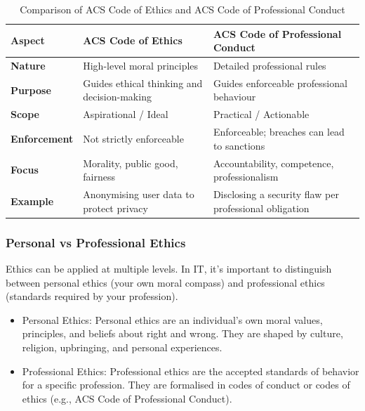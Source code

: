 \begin{table}[htbp]
\centering
\renewcommand{\arraystretch}{1.35}
\begin{tabular}{|p{3cm}|p{7cm}|p{7cm}|}
\hline
\textbf{Aspect} & \textbf{ACS Code of Ethics} & \textbf{ACS Code of Professional Conduct} \\
\hline

\textbf{Nature} &
High-level moral principles &
Detailed professional rules \\
\hline

\textbf{Purpose} &
Guides ethical thinking and decision-making &
Guides enforceable professional behaviour \\
\hline

\textbf{Scope} &
Aspirational / Ideal &
Practical / Actionable \\
\hline

\textbf{Enforcement} &
Not strictly enforceable &
Enforceable; breaches can lead to sanctions \\
\hline

\textbf{Focus} &
Morality, public good, fairness &
Accountability, competence, professionalism \\
\hline

\textbf{Example} &
Anonymising user data to protect privacy &
Disclosing a security flaw per professional obligation \\
\hline

\end{tabular}
\caption{Comparison of ACS Code of Ethics and ACS Code of Professional Conduct}
\end{table}

\subsubsection{Personal vs Professional Ethics}

\indent 

Ethics can be applied at multiple levels.  In IT, it’s important to distinguish between personal ethics (your own moral compass) and professional ethics (standards required by your profession).

\begin{itemize}
    \item Personal Ethics: Personal ethics are an individual’s own moral values, principles, and beliefs about right and wrong. They are shaped by culture, religion, upbringing, and personal experiences.
    \item Professional Ethics: Professional ethics are the accepted standards of behavior for a specific profession. They are formalised in codes of conduct or codes of ethics (e.g., ACS Code of Professional Conduct).
\end{itemize}

